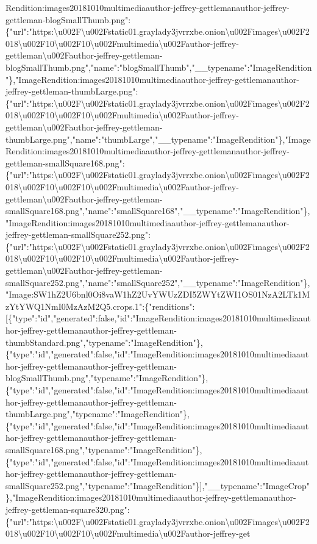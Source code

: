 Rendition:images20181010multimediaauthor-jeffrey-gettlemanauthor-jeffrey-gettleman-blogSmallThumb.png":\{"url":"https:\textbackslash{}u002F\textbackslash{}u002Fstatic01.graylady3jvrrxbe.onion\textbackslash{}u002Fimages\textbackslash{}u002F2018\textbackslash{}u002F10\textbackslash{}u002F10\textbackslash{}u002Fmultimedia\textbackslash{}u002Fauthor-jeffrey-gettleman\textbackslash{}u002Fauthor-jeffrey-gettleman-blogSmallThumb.png","name":"blogSmallThumb","\_\_typename":"ImageRendition"\},"ImageRendition:images20181010multimediaauthor-jeffrey-gettlemanauthor-jeffrey-gettleman-thumbLarge.png":\{"url":"https:\textbackslash{}u002F\textbackslash{}u002Fstatic01.graylady3jvrrxbe.onion\textbackslash{}u002Fimages\textbackslash{}u002F2018\textbackslash{}u002F10\textbackslash{}u002F10\textbackslash{}u002Fmultimedia\textbackslash{}u002Fauthor-jeffrey-gettleman\textbackslash{}u002Fauthor-jeffrey-gettleman-thumbLarge.png","name":"thumbLarge","\_\_typename":"ImageRendition"\},"ImageRendition:images20181010multimediaauthor-jeffrey-gettlemanauthor-jeffrey-gettleman-smallSquare168.png":\{"url":"https:\textbackslash{}u002F\textbackslash{}u002Fstatic01.graylady3jvrrxbe.onion\textbackslash{}u002Fimages\textbackslash{}u002F2018\textbackslash{}u002F10\textbackslash{}u002F10\textbackslash{}u002Fmultimedia\textbackslash{}u002Fauthor-jeffrey-gettleman\textbackslash{}u002Fauthor-jeffrey-gettleman-smallSquare168.png","name":"smallSquare168","\_\_typename":"ImageRendition"\},"ImageRendition:images20181010multimediaauthor-jeffrey-gettlemanauthor-jeffrey-gettleman-smallSquare252.png":\{"url":"https:\textbackslash{}u002F\textbackslash{}u002Fstatic01.graylady3jvrrxbe.onion\textbackslash{}u002Fimages\textbackslash{}u002F2018\textbackslash{}u002F10\textbackslash{}u002F10\textbackslash{}u002Fmultimedia\textbackslash{}u002Fauthor-jeffrey-gettleman\textbackslash{}u002Fauthor-jeffrey-gettleman-smallSquare252.png","name":"smallSquare252","\_\_typename":"ImageRendition"\},"Image:SW1hZ2U6bnl0Oi8vaW1hZ2UvYWUzZDI5ZWYtZWI1OS01NzA2LTk1MzYtYWQ1NmI0MzAzM2Q5.crops.1":\{"renditions":{[}\{"type":"id","generated":false,"id":"ImageRendition:images20181010multimediaauthor-jeffrey-gettlemanauthor-jeffrey-gettleman-thumbStandard.png","typename":"ImageRendition"\},\{"type":"id","generated":false,"id":"ImageRendition:images20181010multimediaauthor-jeffrey-gettlemanauthor-jeffrey-gettleman-blogSmallThumb.png","typename":"ImageRendition"\},\{"type":"id","generated":false,"id":"ImageRendition:images20181010multimediaauthor-jeffrey-gettlemanauthor-jeffrey-gettleman-thumbLarge.png","typename":"ImageRendition"\},\{"type":"id","generated":false,"id":"ImageRendition:images20181010multimediaauthor-jeffrey-gettlemanauthor-jeffrey-gettleman-smallSquare168.png","typename":"ImageRendition"\},\{"type":"id","generated":false,"id":"ImageRendition:images20181010multimediaauthor-jeffrey-gettlemanauthor-jeffrey-gettleman-smallSquare252.png","typename":"ImageRendition"\}{]},"\_\_typename":"ImageCrop"\},"ImageRendition:images20181010multimediaauthor-jeffrey-gettlemanauthor-jeffrey-gettleman-square320.png":\{"url":"https:\textbackslash{}u002F\textbackslash{}u002Fstatic01.graylady3jvrrxbe.onion\textbackslash{}u002Fimages\textbackslash{}u002F2018\textbackslash{}u002F10\textbackslash{}u002F10\textbackslash{}u002Fmultimedia\textbackslash{}u002Fauthor-jeffrey-get